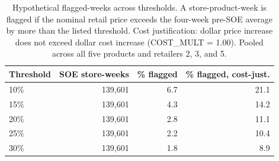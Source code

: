 \begin{table}[!h]
\centering
\caption{\label{tab:tab:flagged_weeks_all}Hypothetical flagged-weeks across thresholds. A store-product-week is flagged if the nominal retail price exceeds the four-week pre-SOE average by more than the listed threshold. Cost justification: dollar price increase does not exceed dollar cost increase (COST\_MULT = 1.00). Pooled across all five products and retailers 2, 3, and 5.}
\centering
\begin{tabular}[t]{lrrr}
\toprule
Threshold & SOE store-weeks & \% flagged & \% flagged, cost-just.\\
\midrule
10\% & 139,601 & 6.7 & 21.1\\
15\% & 139,601 & 4.3 & 14.2\\
20\% & 139,601 & 2.8 & 11.1\\
25\% & 139,601 & 2.2 & 10.4\\
30\% & 139,601 & 1.8 & 8.9\\
\bottomrule
\end{tabular}
\end{table}
